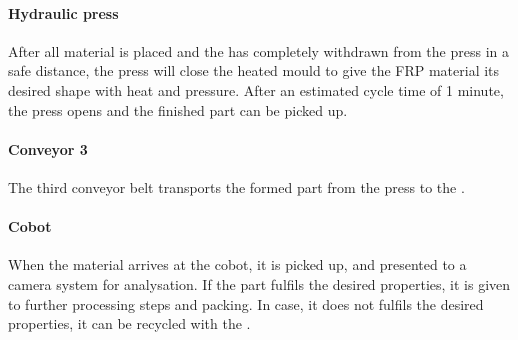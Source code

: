 
\paragraph{Hydraulic press} \label{sec:HydraulicPress}
After all material is placed and the  has completely withdrawn from the press in a safe distance, the press will close the heated mould to give the \ac{FRP} material its desired shape with heat and pressure. After an estimated cycle time of 1 minute, the press opens and the finished part can be picked up.


\paragraph{Conveyor 3}\label{sec:conveyor3}
The third conveyor belt transports the formed part from the press to the .

\paragraph{Cobot} \label{sec:Cobot}
When the material arrives at the cobot, it is picked up, and presented to a camera system for analysation. If the part fulfils the desired properties, it is given to further processing steps and packing.
In case, it does not fulfils the desired properties, it can be recycled with the .